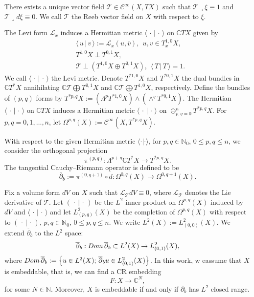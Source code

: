 \documentclass[12pt]{amsart}
\theoremstyle{definition}
\theoremstyle{named}
\numberwithin{equation}{subsection}
\newcommand{\ol}{\overline}
\newcommand{\C}{\mathbb{C}}
\newcommand{\ddbar}{\overline\partial}
\newcommand{\set}[1]{\left\{#1\right\}}
\newcommand{\To}{\rightarrow}
\def\cC{\mathscr{C}}
\begin{document}
There exists a unique vector field $\mathcal{T}\in\cC^\infty(X,TX)$ such that $\mathcal{T}\lrcorner\xi\equiv1$ and $\mathcal{T}\lrcorner d\xi\equiv 0$. We call $\mathcal{T}$ the Reeb vector field on $X$ with respect to $\xi$.

The Levi form $\mathcal{L}_x$ induces a Hermitian metric $\langle\,\cdot\,|\,\cdot\,\rangle$ on $\mathbb CTX$ given by 
 \begin{equation}\label{e-gue241115yyd}
 \begin{split}
&\langle\,u\,|\,v\,\rangle:=\mathcal{L}_x(u,\ol v),\ \ u, v\in T^{1,0}_xX,\\
&T^{1,0}X\perp T^{0,1}X,\\
&\mathcal{T}\perp(T^{1,0}X\oplus T^{0,1}X),\ \ \langle\,T\,|\,T\,\rangle=1.
\end{split}
 \end{equation}
We call $\langle\,\cdot\,|\,\cdot\,\rangle$ the Levi metric. Denote  $T^{*1,0}X$ and $T^{*0,1}X$ the dual bundles in 
$\C T^*X$ annihilating $\C\mathcal{T}\bigoplus T^{0,1}X$
and $\C\mathcal{T}\bigoplus T^{1,0}X$, respectively. 
Define the bundles of $(p,q)$ forms by $T^{*p,q}X:=(\Lambda^pT^{*1,0}X)\wedge(\wedge^qT^{*0,1}X)$. 
The Hermitian $\langle\,\cdot\,|\,\cdot\,\rangle$ on $\mathbb CTX$ induces a Hermitian metric 
$\langle\,\cdot\,|\,\cdot\,\rangle$ on $\oplus^n_{p,q=0}T^{*p,q}X$. For $p,q=0,1,\ldots,n$, let $\Omega^{p,q}(X):=\cC^\infty(X,T^{*p,q}X)$.

With respect to the given Hermitian metric 
$\langle\cdot|\cdot\rangle$, for $p, q\in\mathbb N_0$, $0\leq p,q\leq n$, we consider the orthogonal projection
\begin{equation}
\pi^{(p,q)}:\Lambda^{p+q}\mathbb{C}T^*X\to T^{*p,q}X.
\end{equation}
The tangential Cauchy--Riemann operator is defined to be 
\begin{equation}
\label{tangential Cauchy Riemann operator}
\overline{\partial}_b:=\pi^{(0,q+1)}\circ d:
\Omega^{0,q}(X)\to\Omega^{0,q+1}(X).
\end{equation}


Fix a volume form $dV$ on $X$ such that $\mathcal{L}_{\mathcal{T}}dV\equiv 0$, where $\mathcal{L}_{\mathcal{T}}$ denotes the Lie derivative of $\mathcal{T}$. Let $(\,\cdot\,|\,\cdot\,)$ be the $L^2$ inner product on $\Omega^{p,q}(X)$ induced by $dV$ and $\langle\,\cdot\,|\,\cdot\,\rangle$ and let $L^2_{(p,q)}(X)$ be the completion of $\Omega^{p,q}(X)$ with respect to $(\,\cdot\,|\,\cdot\,)$, $p, q\in\mathbb N_0$, $0\leq p,q\leq n$. We write $L^2(X):=L^2_{(0,0)}(X)$.
We extend $\ddbar_b$ to the $L^2$ space:
\[\ddbar_b: {\rm Dom\,}\ddbar_b\subset L^2(X)\To L^2_{(0,1)}(X),\]
where ${\rm Dom\,}\ddbar_b:=\set{u\in L^2(X);\, \ddbar_bu\in L^2_{(0,1)}(X)}$. In this work, w eassume that $X$ is embeddable, that is,  we can find a CR embedding 
\[F: X\To\mathbb C^N,\]
for some $N\in\mathbb N$. Moreover, $X$ is embeddable if and only if $\ddbar_b$ has $L^2$ closed range.  
\end{document}
